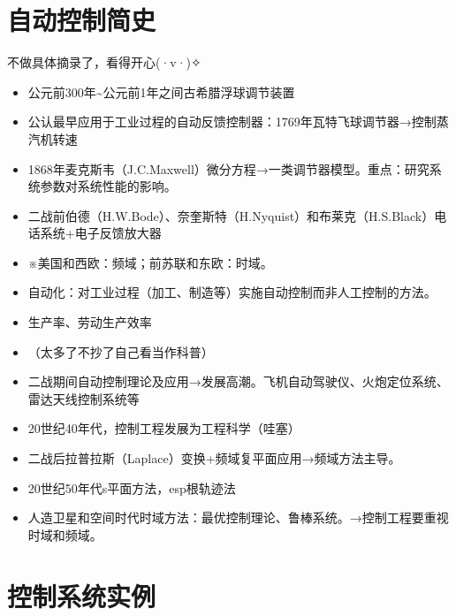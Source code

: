 \documentclass{NHNotebook}
\begin{document}
\section{自动控制简史}
不做具体摘录了，看得开心(·v·)✧
\begin{itemize}
    \item 公元前300年\~{}公元前1年之间\phantom{哟}古希腊\phantom{嚯}浮球调节装置
    \item 公认最早应用于工业过程的自动反馈控制器：1769年\phantom{占}瓦特\phantom{位}飞球调节器→控制蒸汽机转速
    \item 1868年\phantom{的}麦克斯韦（J.C.Maxwell）\phantom{字}微分方程→一类调节器模型。重点：研究系统参数对系统性能的影响。
    \item 二战前\phantom{符}伯德（H.W.Bode）、奈奎斯特（H.Nyquist）和布莱克（H.S.Black）\phantom{一}电话系统+电子反馈放大器
    \item ※美国和西欧：频域；前苏联和东欧：时域。
    \item 自动化：对工业过程（加工、制造等）实施自动控制而非人工控制的方法。
    \item 生产率、劳动生产效率
    \item （太多了不抄了自己看当作科普）
    \item 二战期间\phantom{二}自动控制理论及应用→发展高潮。飞机自动驾驶仪、火炮定位系统、雷达天线控制系统等
    \item 20世纪40年代，控制工程发展为工程科学（哇塞）
    \item 二战后\phantom{一}拉普拉斯（Laplace）变换+频域复平面应用→频域方法主导。
    \item 20世纪50年代\phantom{字}s平面方法，esp根轨迹法
    \item 人造卫星和空间时代\phantom{一}时域方法：最优控制理论、鲁棒系统。→控制工程要重视时域和频域。
\end{itemize}

\section{控制系统实例}
\end{document}
